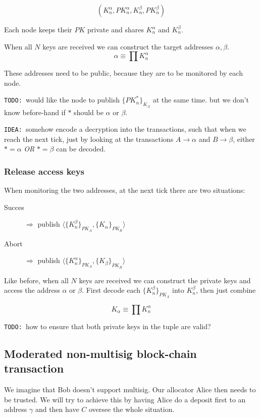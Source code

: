 \documentclass[a4paper]{article}
\newcommand{\TODO}{{\color{red}\texttt{TODO: }}}
\newcommand{\IDEA}{{\color{blue}\texttt{IDEA: }}}
\newcommand{\crypt}[1]{\ensuremath{ {\lbrace {#1} \rbrace} } }
\begin{document}
\[
	(K_n^\alpha, PK_n^\alpha, K_n^\beta, PK_n^\beta)
\]

Each node keeps their $PK$ private and shares $K_n^\alpha$ and $K_n^\beta$.

When all $N$ keys are received we can construct the target addresses $\alpha, \beta$.
\[
	\alpha \equiv \prod K_n^\alpha
\]

These addresses need to be public, because they are to be monitored by each node.

\TODO would like the node to publish $\crypt{PK_n^*}_{K_A}$ at the same time. but we don't know before-hand if $*$ should be $\alpha$ or $\beta$.

\IDEA somehow encode a decryption into the transactions, such that when we reach the next tick, just by looking at the transactions $A\to\alpha$ and $B\to\beta$, either $*=\alpha$ \emph{OR} $*=\beta$ can be decoded.

\subsubsection{Release access keys}

When monitoring the two addresses, at the next tick there are two situations:

\begin{description}
\item[Succes] $\Rightarrow$ publish $\langle \crypt{K_n^\beta}_{PK_A}, \crypt{K_\alpha}_{PK_B} \rangle$
\item[Abort] $\Rightarrow$ publish $\langle \crypt{K_n^\alpha}_{PK_A}, \crypt{K_\beta}_{PK_B} \rangle$
\end{description}

Like before, when all $N$ keys are received we can construct the private keys and access the address $\alpha$ or $\beta$. First decode each $\crypt{K_n^\beta}_{PK_A}$ into $K_n^\beta$, then just combine

\[
	K_\alpha \equiv \prod K_n^\alpha
\]

\TODO how to ensure that both private keys in the tuple are valid?

\subsection{Moderated non-multisig block-chain transaction}

We imagine that Bob doesn't support multisig. Our allocator Alice then needs to be trusted. We will try to achieve this by having Alice do a deposit first to an address $\gamma$ and then have $C$ oversee the whole situation.
\end{document}
